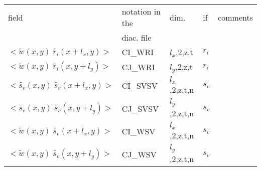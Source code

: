 \begin{center}
\begin{tabular}{||p{6cm}|>{\centering}p{2.5cm}|>{\centering}p{1.5cm}|>{\centering}p{0.5cm}|p{5cm }||}
\hline
\hline
field & notation in the & dim. &  if  & comments\\
& diac. file &           &  & \\
\hline
\hline
$<\tilde{w}(x,y)\;\tilde{r_i}(x+l_x,y)>$ & CI\_WRI & $l_x$,2,z,t & $r_i$ & \\
\hline
$<\tilde{w}(x,y)\;\tilde{r_i}(x,y+l_y)>$ & CJ\_WRI & $l_y$,2,z,t & $r_i$ & \\
\hline
$<\tilde{s_v}(x,y)\;\tilde{s_v}(x+l_x,y)>$ & CI\_SVSV & $l_x$,2,z,t,n & $s_v$ & \\
\hline
$<\tilde{s_v}(x,y)\;\tilde{s_v}(x,y+l_y)>$ & CJ\_SVSV & $l_y$,2,z,t,n & $s_v$ & \\
\hline
$<\tilde{w}(x,y)\;\tilde{s_v}(x+l_x,y)>$ & CI\_WSV & $l_x$,2,z,t,n & $s_v$ & \\
\hline
$<\tilde{w}(x,y)\;\tilde{s_v}(x,y+l_y)>$ & CJ\_WSV & $l_y$,2,z,t,n & $s_v$ & \\
\hline
\hline
\end{tabular}
\end{center}

